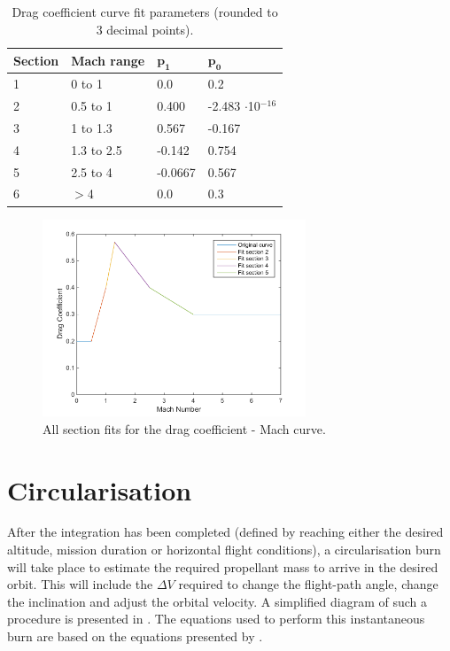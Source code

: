 \begin{table}[H]
\begin{center}
\caption{Drag coefficient curve fit parameters (rounded to 3 decimal points).}
\label{tab:dragCoeffPara}
\begin{tabular}{|l|l||l|l|}
\hline 
\textbf{Section}  & \textbf{Mach range}& $\mathbf{p_{1}}$ & $\mathbf{p_{0}}$ \\ \hline 
1 & 0 to 1 & 0.0 & 0.2 \\ \hline
2  & 0.5 to 1  & 0.400 & -2.483 $\cdot$10$^{-16}$  \\ \hline
3  & 1 to 1.3  & 0.567 & -0.167  \\ \hline
4  &  1.3 to 2.5 & -0.142 & 0.754 \\ \hline
5  &  2.5 to 4 & -0.0667 & 0.567 \\ \hline
6 & $>$4 & 0.0 & 0.3 \\ \hline
\end{tabular}
\end{center}
\end{table}



\begin{figure}[H]
\centering
\includegraphics[width=0.7\textwidth]{figures/software/dragCoeffFit.png}
\caption{All section fits for the drag coefficient - Mach curve.}
\label{fig:dragCoeffFit}
\end{figure}

\pagebreak

\section{Circularisation}
\label{sec:modelCircularisation}
After the integration has been completed (defined by reaching either the desired altitude, mission duration or horizontal flight conditions), a circularisation burn will take place to estimate the required propellant mass to arrive in the desired orbit. This will include the $\Delta V$ required to change the flight-path angle, change the inclination and adjust the orbital velocity. A simplified diagram of such a procedure is presented in . The equations used to perform this instantaneous burn are based on the equations presented by \cite{wakker2010}.

